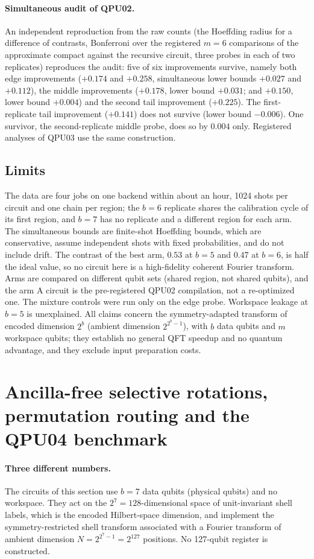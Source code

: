 \documentclass[11pt]{article}
\begin{document}
\paragraph{Simultaneous audit of QPU02.} An independent reproduction from the raw counts (the Hoeffding radius for a difference of contrasts, Bonferroni over the registered $m=6$ comparisons of the approximate compact against the recursive circuit, three probes in each of two replicates) reproduces the audit: five of six improvements survive, namely both edge improvements ($+0.174$ and $+0.258$, simultaneous lower bounds $+0.027$ and $+0.112$), the middle improvements ($+0.178$, lower bound $+0.031$; and $+0.150$, lower bound $+0.004$) and the second tail improvement ($+0.225$). The first-replicate tail improvement ($+0.141$) does not survive (lower bound $-0.006$). One survivor, the second-replicate middle probe, does so by $0.004$ only. Registered analyses of QPU03 use the same construction.

\subsection{Limits}
The data are four jobs on one backend within about an hour, 1024 shots per circuit and one chain per region; the $b=6$ replicate shares the calibration cycle of its first region, and $b=7$ has no replicate and a different region for each arm. The simultaneous bounds are finite-shot Hoeffding bounds, which are conservative, assume independent shots with fixed probabilities, and do not include drift. The contrast of the best arm, $0.53$ at $b=5$ and $0.47$ at $b=6$, is half the ideal value, so no circuit here is a high-fidelity coherent Fourier transform. Arms are compared on different qubit sets (shared region, not shared qubits), and the arm A circuit is the pre-registered QPU02 compilation, not a re-optimized one. The mixture controls were run only on the edge probe. Workspace leakage at $b=5$ is unexplained. All claims concern the symmetry-adapted transform of encoded dimension $2^b$ (ambient dimension $2^{2^b-1}$), with $b$ data qubits and $m$ workspace qubits; they establish no general QFT speedup and no quantum advantage, and they exclude input preparation costs.

\section{Ancilla-free selective rotations, permutation routing and the QPU04 benchmark}\label{sec:selective}
\paragraph{Three different numbers.} The circuits of this section use $b=7$ data qubits (physical qubits) and no workspace. They act on the $2^7=128$-dimensional space of unit-invariant shell labels, which is the encoded Hilbert-space dimension, and implement the symmetry-restricted shell transform associated with a Fourier transform of ambient dimension $N=2^{2^7-1}=2^{127}$ positions. No 127-qubit register is constructed.
\end{document}

